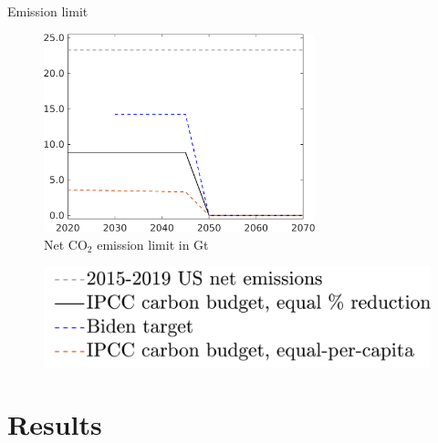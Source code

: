 \documentclass[11pt,aspectratio=169]{beamer}
\begin{document}
\begin{frame}{Emission limit}
	\begin{center}
		\begin{minipage}{0.6\textwidth}
			\begin{figure}
				\caption{Net CO$_2$ emission limit in Gt}
				\includegraphics[width=0.7\textwidth]{../codding_model/own_basedOnFried/optimalPol_010922_revision/figures/all_13Sept22_Tplus30/Emnet_goals_o1_lgd0.png}
			\end{figure}
		\end{minipage}
		\hspace{-10mm}
		\begin{minipage}{0.3\textwidth}
			\begin{figure}
				\includegraphics[width=1.4\textwidth]{../codding_model/own_basedOnFried/optimalPol_010922_revision/figures/all_13Sept22_Tplus30/Emnet_goals_o1_lgd1.png}
			\end{figure}
		\end{minipage}
	\end{center}
\end{frame}
	\hypertarget{resback}{}
	\section{Results}
	
\end{document}
